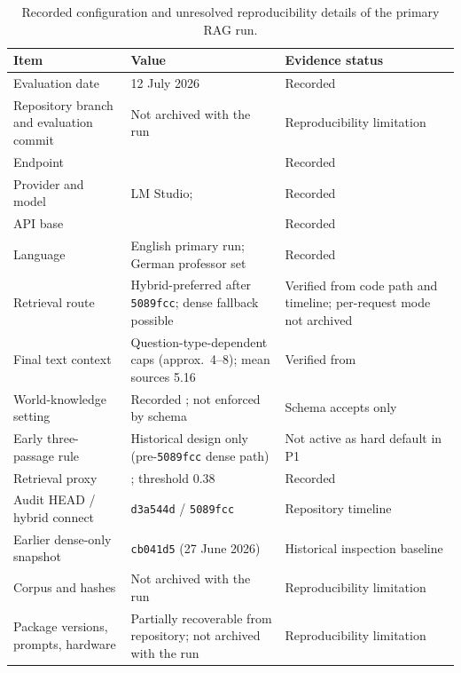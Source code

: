 \begin{table}[htbp]
  \centering
  \caption{Recorded configuration and unresolved reproducibility details of the primary RAG run.}
  \label{tab:results-config}
  \small
  \begin{tabularx}{\textwidth}{L{0.25\textwidth}Y L{0.19\textwidth}}
    \toprule
    Item & Value & Evidence status \\
    \midrule
    Evaluation date & 12 July 2026 & Recorded \\
    Repository branch and evaluation commit & Not archived with the run & Reproducibility limitation \\
    Endpoint &  & Recorded \\
    Provider and model & LM Studio;  & Recorded \\
    API base &  & Recorded \\
    Language & English primary run; German professor set & Recorded \\
    Retrieval route & Hybrid-preferred  after \texttt{5089fcc}; dense fallback possible & Verified from code path and timeline; per-request mode not archived \\
    Final text context & Question-type-dependent caps (approx.\ 4--8); mean sources 5.16 & Verified from  \\
    World-knowledge setting & Recorded ; not enforced by schema & Schema accepts only  \\
    Early three-passage rule & Historical design only (pre-\texttt{5089fcc} dense path) & Not active as hard default in P1 \\
    Retrieval proxy & ; threshold 0.38 & Recorded \\
    Audit HEAD / hybrid connect & \texttt{d3a544d} / \texttt{5089fcc} & Repository timeline \\
    Earlier dense-only snapshot & \texttt{cb041d5} (27 June 2026) & Historical inspection baseline \\
    Corpus and hashes & Not archived with the run & Reproducibility limitation \\
    Package versions, prompts, hardware & Partially recoverable from repository; not archived with the run & Reproducibility limitation \\
    \bottomrule
  \end{tabularx}
\end{table}

